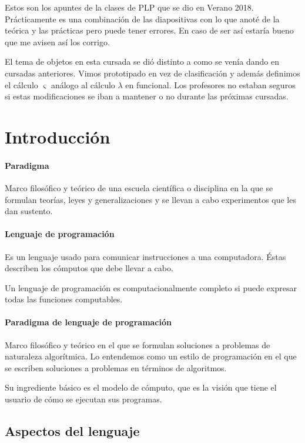 Estos son los apuntes de la clases de PLP que se dio en Verano 2018. Prácticamente es una combinación de las diapositivas con lo que anoté de la teórica y las prácticas pero puede tener errores. En caso de ser así estaría bueno que me avisen así los corrigo. 

El tema de objetos en esta cursada se dió distinto a como se venía dando en cursadas anteriores. Vimos prototipado en vez de clasificación y además definimos el cálculo $\varsigma$ análogo al cálculo $\lambda$ en funcional. Los profesores no estaban seguros si estas modificaciones se iban a mantener o no durante las próximas cursadas.

\section{Introducción}

\paragraph{Paradigma} Marco filosófico y teórico de una escuela científica o disciplina en la que se formulan teorías, leyes y generalizaciones y se llevan a cabo experimentos que les dan sustento.

\paragraph{Lenguaje de programación} Es un lenguaje usado para comunicar instrucciones a una computadora. Éstas describen los cómputos que debe llevar a cabo.

Un lenguaje de programación es computacionalmente completo si puede expresar todas las funciones computables.

\paragraph{Paradigma de lenguaje de programación} Marco filosófico y teórico en el que se formulan soluciones a problemas de naturaleza algorítmica. Lo entendemos como un estilo de programación en el que se escriben soluciones a problemas en términos de algoritmos.

Su ingrediente básico es el modelo de cómputo, que es la visión que tiene el usuario de cómo se ejecutan sus programas.

\subsection{Aspectos del lenguaje}


